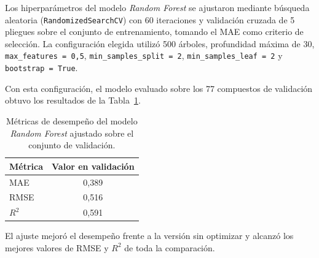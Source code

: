 Los hiperparámetros del modelo \textit{Random Forest} se ajustaron mediante búsqueda aleatoria (\texttt{RandomizedSearchCV}) con 60 iteraciones y validación cruzada de 5 pliegues sobre el conjunto de entrenamiento, tomando el MAE como criterio de selección. La configuración elegida utilizó 500 árboles, profundidad máxima de 30, \texttt{max\_features = 0,5}, \texttt{min\_samples\_split = 2}, \texttt{min\_samples\_leaf = 2} y \texttt{bootstrap = True}.

Con esta configuración, el modelo evaluado sobre los 77 compuestos de validación obtuvo los resultados de la Tabla~\ref{tab:ap_rf_final}.

\begin{table}[htbp]
\centering
\caption{Métricas de desempeño del modelo \textit{Random Forest} ajustado sobre el conjunto de validación.}
\label{tab:ap_rf_final}
\begin{tabular}{lc}
\toprule
Métrica & Valor en validación \\
\midrule
MAE   & 0,389 \\
RMSE  & 0,516 \\
$R^2$ & 0,591 \\
\bottomrule
\end{tabular}
\end{table}

El ajuste mejoró el desempeño frente a la versión sin optimizar y alcanzó los mejores valores de RMSE y $R^2$ de toda la comparación.
